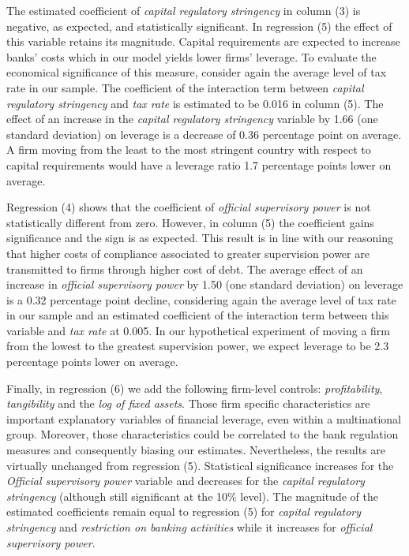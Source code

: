 \documentclass[12pt]{article}
\begin{document}
	  The estimated coefficient of \textit{capital regulatory stringency} in column (3) is negative, as expected, and statistically significant. In regression (5) the effect of this variable retains its magnitude. Capital requirements are expected to increase banks' costs which in our model yields lower firms' leverage. To evaluate the economical significance of this measure, consider again the average level of tax rate in our sample. The coefficient of the interaction term between \textit{capital regulatory stringency} and \textit{tax rate} is estimated to be 0.016 in column (5). The effect of an increase in the \textit{capital regulatory stringency} variable by 1.66 (one standard deviation) on leverage is a decrease of 0.36 percentage point on average. A firm moving from the least to the most stringent country with respect to capital requirements would have a leverage ratio 1.7 percentage points lower on average.
	
	  Regression (4) shows that the coefficient of \textit{official supervisory power} is not statistically different from zero. However, in column (5) the coefficient gains significance and the sign is as expected. This result is in line with our reasoning that higher costs of compliance associated to greater supervision power are transmitted to firms through higher cost of debt. The average effect of an increase in \textit{official supervisory power} by 1.50 (one standard deviation) on leverage is a 0.32 percentage point decline, considering again the average level of tax rate in our sample and an estimated coefficient of the interaction term between this variable and \textit{tax rate} at 0.005. In our hypothetical experiment of moving a firm from the lowest to the greatest supervision power, we expect leverage to be 2.3 percentage points lower on average.
	
	  Finally, in regression (6) we add the following firm-level controls: \textit{profitability}, \textit{tangibility} and the \textit{log of fixed assets}. Those firm specific characteristics are important explanatory variables of financial leverage, even within a multinational group. Moreover, those characteristics could be correlated to the bank regulation measures and consequently biasing our estimates. Nevertheless, the results are virtually unchanged from regression (5). Statistical significance increases for the \textit{Official supervisory power} variable and decreases for the \textit{capital regulatory stringency} (although still significant at the 10\% level). The magnitude of the estimated coefficients remain equal to regression (5) for \textit{capital regulatory stringency} and \textit{restriction on banking activities} while it increases for \textit{official supervisory power}.
	   	    			   		
\end{document}
